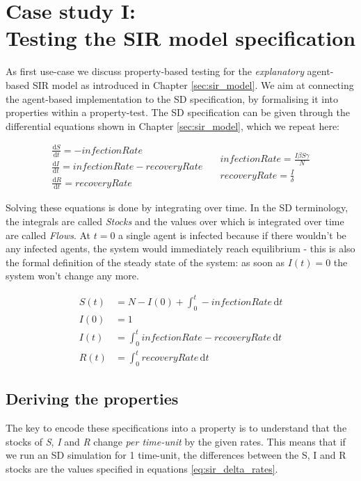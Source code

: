 \section{Case study I: \\ Testing the SIR model specification}
\label{sec:case_SIR}
As first use-case we discuss property-based testing for the \textit{explanatory} agent-based SIR model as introduced in Chapter \ref{sec:sir_model}. We aim at connecting the agent-based implementation to the SD specification, by formalising it into properties within a property-test. The SD specification can be given through the differential equations shown in Chapter \ref{sec:sir_model}, which we repeat here:

\begin{equation}
\begin{split}
\frac{\mathrm d S}{\mathrm d t} = -infectionRate \\
\frac{\mathrm d I}{\mathrm d t} = infectionRate - recoveryRate \\
\frac{\mathrm d R}{\mathrm d t} = recoveryRate 
\end{split}
\quad
\begin{split}
infectionRate = \frac{I \beta S \gamma}{N} \\
recoveryRate = \frac{I}{\delta} 
\end{split}
\end{equation}
\label{eq:sir_delta_rates}

Solving these equations is done by integrating over time. In the SD terminology, the integrals are called \textit{Stocks} and the values over which is integrated over time are called \textit{Flows}. At $t = 0$ a single agent is infected because if there wouldn't be any infected agents, the system would immediately reach equilibrium - this is also the formal definition of the steady state of the system: as soon as $I(t) = 0$ the system won't change any more.

\begin{align}
S(t) &= N - I(0) + \int_0^t -infectionRate\, \mathrm{d}t \\
I(0) &= 1 \\
I(t) &= \int_0^t infectionRate - recoveryRate\, \mathrm{d}t \\
R(t) &= \int_0^t recoveryRate\, \mathrm{d}t
\end{align}

\subsection{Deriving the properties}
The key to encode these specifications into a property is to understand that the stocks of \textit{S}, \textit{I} and \textit{R} change \textit{per time-unit} by the given rates. This means that if we run an SD simulation for 1 time-unit, the differences between the S, I and R stocks are the values specified in equations \ref{eq:sir_delta_rates}. %


